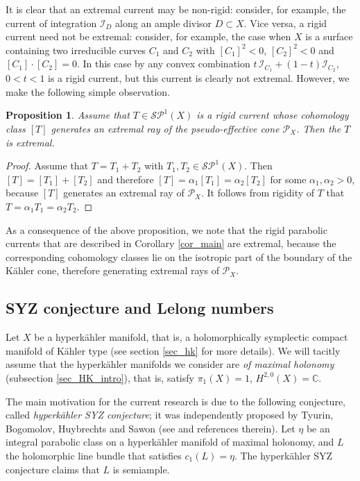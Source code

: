 \documentclass[11pt]{article}
\newcommand{\6}{\partial}
\newcommand{\C}{\mathbb{C}}
\newcommand{\II}{\mathcal{I}}
\newcommand{\PP}{\mathcal{P}}
\newtheorem{prop}[defn]{Proposition}
\begin{document}
It is clear that an extremal current
may be non-rigid: consider, for example, the current of integration $\II_D$
along an ample divisor $D\subset X$. Vice versa, a rigid current
need not be extremal: consider, for example, the case when $X$ is
a surface containing two irreducible curves $C_1$ and $C_2$ with
$[C_1]^2<0$, $[C_2]^2<0$ and $[C_1]\cdot[C_2] = 0$. In this case
by \cite[Proposition 3.15]{Bo} any convex combination $t\,\II_{C_1}+(1-t)\II_{C_2}$,
$0< t < 1$ is a rigid current, but this current is clearly not extremal.
However, we make the following simple observation.

\begin{prop}
Assume that $T\in \mathcal{SP}^1(X)$ is a rigid current whose
cohomology class $[T]$ generates an extremal ray of the pseudo-effective
cone $\PP_X$. Then the $T$ is extremal.
\end{prop}
\begin{proof}
Assume that $T = T_1 + T_2$ with $T_1,T_2\in \mathcal{SP}^1(X)$.
Then $[T] = [T_1] + [T_2]$ and therefore $[T] = \alpha_1[T_1] = \alpha_2[T_2]$
for some $\alpha_1,\alpha_2>0$, because $[T]$ generates an extremal ray of $\PP_X$.
It follows from rigidity of $T$ that $T = \alpha_1 T_1 = \alpha_2 T_2$.
\end{proof}

As a consequence of the above proposition, we note that the rigid
parabolic currents that are described in Corollary \ref{cor_main}
are extremal, because the corresponding cohomology classes lie
on the isotropic part of the boundary of the K\"ahler cone, therefore
generating extremal rays of $\PP_X$. 

\subsection{SYZ conjecture and Lelong numbers}

Let $X$ be a hyperk\"ahler manifold, that is,
a holomorphically symplectic compact manifold
of K\"ahler type (see section \ref{sec_hk} for
more details). We will tacitly assume
that the  hyperk\"ahler manifolds we consider
are {\em of maximal holonomy} (subsection \ref{sec_HK_intro}),
that is, satisfy $\pi_1(X)=1$,
$H^{2,0}(X)=\C$.

The main motivation for the current research is due
to the following conjecture, called {\em hyperk\"ahler SYZ conjecture};
it was independently proposed by Tyurin, Bogomolov, Huybrechts and Sawon
(see \cite{_Verbitsky:SYZ_} and refe\-rences therein).
Let $\eta$ be an integral parabolic class on a hyperk\"ahler
manifold of maximal holonomy, and $L$ the holomorphic
line bundle that satisfies $c_1(L)=\eta$.
The hyperk\"ahler SYZ conjecture claims that $L$ is semiample. 
\end{document}
